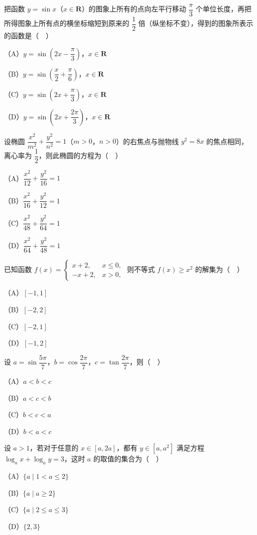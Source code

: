 \begin{question}
把函数 $y=\sin x$（$x\in\mathbf R$）的图象上所有的点向左平行移动 $\dfrac{\pi}3$ 个单位长度，再把所得图象上所有点的横坐标缩短到原来的 $\dfrac12$ 倍（纵坐标不变），得到的图象所表示的函数是（　）

（A）$y=\sin\left(2x-\dfrac{\pi}3\right)$，$x\in\mathbf R$

（B）$y=\sin\left(\dfrac x2+\dfrac{\pi}6\right)$，$x\in\mathbf R$

（C）$y=\sin\left(2x+\dfrac{\pi}3\right)$，$x\in\mathbf R$

（D）$y=\sin\left(2x+\dfrac{2\pi}3\right)$，$x\in\mathbf R$

\end{question}
\begin{question}
设椭圆 $\dfrac{x^2}{m^2}+\dfrac{y^2}{n^2}=1$（$m>0$，$n>0$）的右焦点与抛物线 $y^2=8x$ 的焦点相同，离心率为 $\dfrac12$，则此椭圆的方程为（　）

（A）$\dfrac{x^2}{12}+\dfrac{y^2}{16}=1$

（B）$\dfrac{x^2}{16}+\dfrac{y^2}{12}=1$

（C）$\dfrac{x^2}{48}+\dfrac{y^2}{64}=1$

（D）$\dfrac{x^2}{64}+\dfrac{y^2}{48}=1$

\end{question}
\begin{question}
已知函数 $f(x)=\begin{cases}x+2,&x\leqslant0,\\ -x+2,&x>0,\end{cases}$ 则不等式 $f(x)\geqslant x^2$ 的解集为（　）

（A）$[-1,1]$

（B）$[-2,2]$

（C）$[-2,1]$

（D）$[-1,2]$

\end{question}
\begin{question}
设 $a=\sin\dfrac{5\pi}7$，$b=\cos\dfrac{2\pi}7$，$c=\tan\dfrac{2\pi}7$，则（　）

（A）$a<b<c$

（B）$a<c<b$

（C）$b<c<a$

（D）$b<a<c$

\end{question}
\begin{question}
设 $a>1$，若对于任意的 $x\in[a,2a]$，都有 $y\in[a,a^2]$ 满足方程 $\log_ax+\log_ay=3$，这时 $a$ 的取值的集合为（　）

（A）$\{a\mid1<a\leqslant2\}$

（B）$\{a\mid a\geqslant2\}$

（C）$\{a\mid2\leqslant a\leqslant3\}$

（D）$\{2,3\}$

\end{question}

